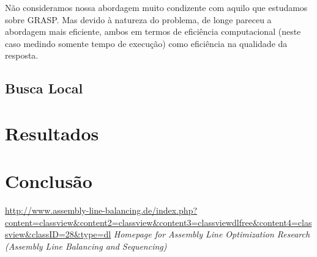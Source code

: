 \documentclass{report}
\begin{document}
Não consideramos nossa abordagem muito condizente com aquilo que estudamos sobre GRASP. Mas devido à natureza do
problema, de longe pareceu a abordagem mais eficiente, ambos em termos de eficiência computacional (neste caso medindo
somente tempo de execução) como eficiência na qualidade da resposta.

\section{Busca Local}

\chapter{Resultados}

\chapter{Conclusão}



	\url{http://www.assembly-line-balancing.de/index.php?content=classview&content2=classview&content3=classviewdlfree&content4=classview&classID=28&type=dl}
	\emph{Homepage for Assembly Line Optimization Research (Assembly Line Balancing and Sequencing)}
\end{document}
